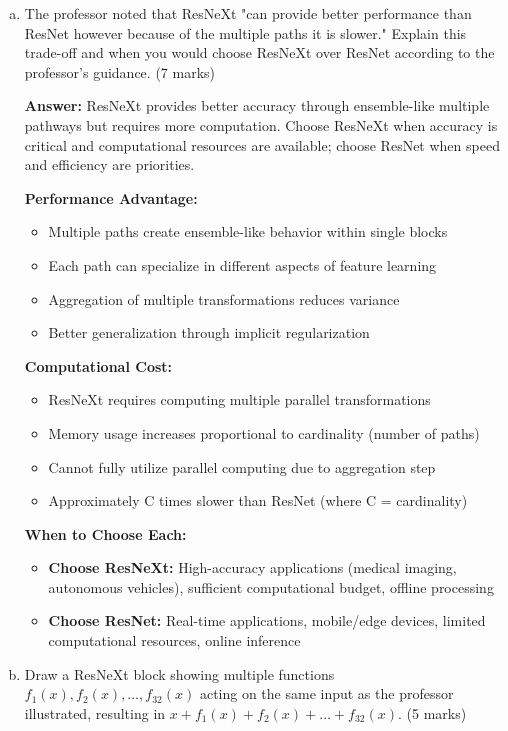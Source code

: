 \documentclass[12pt]{article}
\newcommand{\answer}[1]{{\color{answercolor}\textbf{Answer:} #1}}
\newcommand{\explanation}[1]{{\color{explanationcolor}#1}}
\begin{document}
\begin{enumerate}[(a)]
    \item The professor noted that ResNeXt "can provide better performance than ResNet however because of the multiple paths it is slower." Explain this trade-off and when you would choose ResNeXt over ResNet according to the professor's guidance. \hfill (7 marks)
    
    \answer{ResNeXt provides better accuracy through ensemble-like multiple pathways but requires more computation. Choose ResNeXt when accuracy is critical and computational resources are available; choose ResNet when speed and efficiency are priorities.}
    
    \explanation{
    \textbf{Performance Advantage:}
    \begin{itemize}
        \item Multiple paths create ensemble-like behavior within single blocks
        \item Each path can specialize in different aspects of feature learning
        \item Aggregation of multiple transformations reduces variance
        \item Better generalization through implicit regularization
    \end{itemize}
    
    \textbf{Computational Cost:}
    \begin{itemize}
        \item ResNeXt requires computing multiple parallel transformations
        \item Memory usage increases proportional to cardinality (number of paths)
        \item Cannot fully utilize parallel computing due to aggregation step
        \item Approximately C times slower than ResNet (where C = cardinality)
    \end{itemize}
    
    \textbf{When to Choose Each:}
    \begin{itemize}
        \item \textbf{Choose ResNeXt:} High-accuracy applications (medical imaging, autonomous vehicles), sufficient computational budget, offline processing
        \item \textbf{Choose ResNet:} Real-time applications, mobile/edge devices, limited computational resources, online inference
    \end{itemize}
    }
    
    \item Draw a ResNeXt block showing multiple functions $f_1(x), f_2(x), \ldots, f_{32}(x)$ acting on the same input as the professor illustrated, resulting in $x + f_1(x) + f_2(x) + \ldots + f_{32}(x)$. \hfill (5 marks)
    

\end{enumerate}
\end{document}
